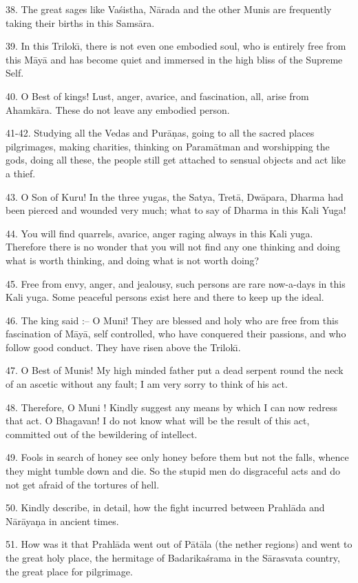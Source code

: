 38. The great sages like Va\'sistha, N\=arada and the other Munis are frequently taking their births in this Sams\=ara.

39. In this Trilok\={\i}, there is not even one embodied soul, who is entirely free from this M\=ay\=a and has become quiet and immersed in the high bliss of the Supreme Self.

40. O Best of kings! Lust, anger, avarice, and fascination, all, arise from Ahamk\=ara. These do not leave any embodied person.

41-42. Studying all the Vedas and Pur\=a\d{n}as, going to all the sacred places pilgrimages, making charities, thinking on Param\=atman and worshipping the gods, doing all these, the people still get attached to sensual objects and act like a thief.

43. O Son of Kuru! In the three yugas, the Satya, Tret\=a, Dw\=apara, Dharma had been pierced and wounded very much; what to say of Dharma in this Kali Yuga!

44. You will find quarrels, avarice, anger raging always in this Kali yuga. Therefore there is no wonder that you will not find any one thinking and doing what is worth thinking, and doing what is not worth doing?

45. Free from envy, anger, and jealousy, such persons are rare now-a-days in this Kali yuga. Some peaceful persons exist here and there to keep up the ideal.

46. The king said :-- O Muni! They are blessed and holy who are free from this fascination of M\=ay\=a, self controlled, who have conquered their passions, and who follow good conduct. They have risen above the Trilok\={\i}.

47. O Best of Munis! My high minded father put a dead serpent round the neck of an ascetic without any fault; I am very sorry to think of his act.

48. Therefore, O Muni ! Kindly suggest any means by which I can now redress that act. O Bhagavan! I do not know what will be the result of this act, committed out of the bewildering of intellect.

49. Fools in search of honey see only honey before them but not the falls, whence they might tumble down and die. So the stupid men do disgraceful acts and do not get afraid of the tortures of hell.

50. Kindly describe, in detail, how the fight incurred between Prahl\=ada and N\=ar\=aya\d{n}a in ancient times.

51. How was it that Prahl\=ada went out of P\=at\=ala (the nether regions) and went to the great holy place, the hermitage of Badarika\'srama in the S\=arasvata country, the great place for pilgrimage.

